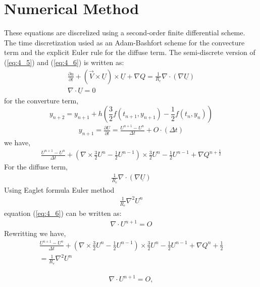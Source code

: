 \documentclass[11pt]{report}
\newcommand{\sps}{\\[0.2cm]}
\newcommand{\refn}[1]{(\ref{#1})}
\newcommand{\refx}[1]{\refn{eq:#1}}
\begin{document}
	\section{Numerical Method}
	These equations are discrelized using a second-order finite differential scheme. The time discretization usied as an Adam-Bashfort scheme for the convecture term and the explicit Euler rule for the diffuse term. The semi-discrete version of \refx{4_5} and \refx{4_6} is written as:
	\begin{gather*}
		\frac{\partial u}{\partial t} + (\vec{V}\times\underline{U}) \times \underline{U} + \nabla Q = \frac{1}{R_e}\nabla \cdot (\nabla \underline{U})\sps
		\nabla \cdot \underline{U} = 0
	\end{gather*}
	for the converture term, 
	\begin{equation*}
		y_{n+2} = y_{n+1} + h\left(\frac{3}{2}f(t_{n+1}, y_{n+1})-\frac{1}{2}f(t_n,y_n)\right)
	\end{equation*}
	\begin{eqnarray}
		y_{n+1} = \frac{\partial U}{\partial t} = \frac{U^{n+1}-U^n}{\Delta t} + O\cdot(\Delta t)
	\end{eqnarray}
	we have,
	\begin{eqnarray}
		\frac{U^{n+1}-U^n}{\Delta t} + \left(\nabla \times\frac{3}{2}U^n-\frac{1}{2}U^{n-1}\right)\times\frac{3}{2}U^{n} - \frac{1}{2}U^{n-1} + \nabla Q^{n+\frac{1}{2}}
	\end{eqnarray}
	For the diffuse term,
	\begin{eqnarray*}
		\frac{1}{R_e}\nabla \cdot (\nabla \underline{U})
	\end{eqnarray*}
	Using Eaglet formula Euler method
	\begin{eqnarray}
		\frac{1}{R_e}\nabla^2 U^n
	\end{eqnarray}
	equation \refx{4_6} can be written as:
	\begin{eqnarray}
		\nabla \cdot U^{n+1}=O
	\end{eqnarray}
	Rewritting we have,
	\begin{multline}
		\frac{U^{n+1} - U^n}{\Delta t} +\left(\nabla \times \frac{3}{2}U^n -\frac{1}{2}U^{n-1}\right)\times\frac{3}{2}U^{n} - \frac{1}{2}U^{n-1} + \nabla Q^n + \frac{1}{2} \\= \frac{1}{R_e}\nabla^2 U^{n}
 	\end{multline}
	
	\begin{eqnarray*}
		\nabla \cdot U^{n+1}=O,
	\end{eqnarray*}
	
\end{document}
